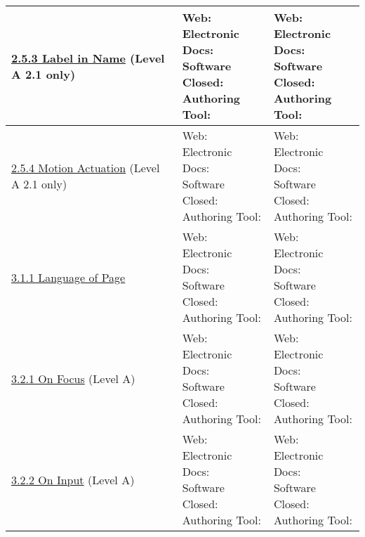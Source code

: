 \documentclass[a4paper]{report}
\begin{document}
\begin{longtable}{|l|l|l|}
        \hline
        \href{https://www.w3.org/TR/WCAG21/#label-in-name}{2.5.3 Label in Name} (Level A 2.1 only) & \makecell{Web: \\ Electronic Docs: \\ Software \\ Closed: \\ Authoring Tool:} & \makecell{Web: \\ Electronic Docs: \\ Software \\ Closed: \\ Authoring Tool:}\\
        \hline
        \href{https://www.w3.org/TR/WCAG21/#motion-actuation}{2.5.4 Motion Actuation} (Level A 2.1 only) & \makecell{Web: \\ Electronic Docs: \\ Software \\ Closed: \\ Authoring Tool:} & \makecell{Web: \\ Electronic Docs: \\ Software \\ Closed: \\ Authoring Tool:}\\
        \hline
        \href{http://www.w3.org/TR/WCAG20/#meaning-doc-lang-id}{3.1.1 Language of Page} & \makecell{Web: \\ Electronic Docs: \\ Software \\ Closed: \\ Authoring Tool:} & \makecell{Web: \\ Electronic Docs: \\ Software \\ Closed: \\ Authoring Tool:}\\
        \hline
        \href{http://www.w3.org/TR/WCAG20/#consistent-behavior-receive-focus}{3.2.1 On Focus} (Level A) & \makecell{Web: \\ Electronic Docs: \\ Software \\ Closed: \\ Authoring Tool:} & \makecell{Web: \\ Electronic Docs: \\ Software \\ Closed: \\ Authoring Tool:}\\
        \hline
        \href{http://www.w3.org/TR/WCAG20/#consistent-behavior-unpredictable-change}{3.2.2 On Input} (Level A) & \makecell{Web: \\ Electronic Docs: \\ Software \\ Closed: \\ Authoring Tool:} & \makecell{Web: \\ Electronic Docs: \\ Software \\ Closed: \\ Authoring Tool:}\\

\end{longtable}
\end{document}

